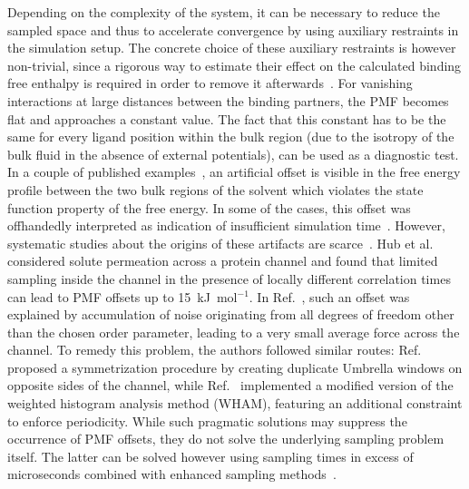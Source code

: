 \documentclass[9pt,lessons]{livecoms}
\begin{document}
Depending on the complexity of the system, it can be necessary to reduce the sampled space and thus to accelerate convergence by using auxiliary restraints in the simulation setup.
The concrete choice of these auxiliary restraints is however non-trivial, since a rigorous way to estimate their effect on the calculated binding free enthalpy is required in order to remove it afterwards~\cite{woo2005calculation, boresch2003absolute}.
For vanishing interactions at large distances between the binding partners, the PMF becomes flat and approaches a constant value.
The fact that this constant has to be the same for every ligand position within the bulk region (due to the isotropy of the bulk fluid in the absence of external potentials), can be used as a diagnostic test.
In a couple of published examples~\cite{filippini2012energetic, filippini2012association, allen2006ion, allen2006molecular, bacstuug2008potential, hub2010g_wham}, an artificial offset is visible in the free energy profile between the two bulk regions of the solvent which violates the state function property of the free energy.
In some of the cases, this offset was offhandedly interpreted as indication of insufficient simulation time~\cite{bacstuug2008potential}.
However, systematic studies about the origins of these artifacts are scarce~\cite{velez2013overcoming}. 
Hub et al.~\cite{hub2010g_wham} considered solute permeation across a protein channel and found that limited sampling inside the channel in the presence of locally different correlation times can lead to PMF offsets up to 15~kJ~mol$^{-1}$.
In Ref.~, such an offset was explained by accumulation of noise originating from all degrees of freedom other than the chosen order parameter, leading to a very small average force across the channel.
To remedy this problem, the authors followed similar routes: 
Ref.~ proposed a symmetrization procedure by creating duplicate Umbrella windows on opposite sides of the channel, while Ref.~ implemented a modified version of the weighted histogram analysis method (WHAM), featuring an additional constraint to enforce periodicity.
While such pragmatic solutions may suppress the occurrence of PMF offsets, they do not solve the underlying sampling problem itself.
The latter can be solved however using sampling times in excess of microseconds combined with enhanced sampling methods~\cite{sun2018molecular}.
\end{document}

